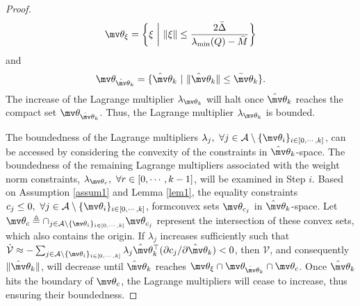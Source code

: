 \documentclass[lettersize,journal]{IEEEtran}
\newcommand*{\wth}{\mv\theta}
\begin{document}
\begin{proof}
\begin{equation}
    \wth_\xi = 
    \bigg\{ \xi \ \bigg\vert\ \Vert\xi\Vert \le  
    {2\bar \Delta\over \lambda _\text{min}(Q)-\bar M} 
    \bigg\}
\end{equation}
and
\begin{equation}\label{eq: hat wth k bnd}
    \wth_{\hat\wth_k} = 
    \{
    \hat\wth_k 
    \ 
    \vert
    \ 
    \Vert
    \hat\wth_k\Vert \le  
    \bar\wth_k
    \}
    .
\end{equation}
The increase of the Lagrange multiplier $\lambda_{\wth_k}$ will halt once $\hat \wth_k$ reaches the compact set $\wth_{\hat\wth_k}$. Thus, the Lagrange multiplier $\lambda_{\wth_k}$ is bounded.





The boundedness of the Lagrange multipliers $\lambda_j,\ \forall j\in\mathcal A\setminus\{\wth_i\}_{i\in[0,\cdots,k]}$, can be accessed by considering the convexity of the constraints in $\hat\wth_k$-space.
The boundedness of the remaining Lagrange multipliers associated with the weight norm constraints, $\lambda_{\wth_r},\ \forall r\in[0,\cdots,k-1]$, will be examined in Step $i$. Based on Assumption \ref{assum1} and Lemma \ref{lem1},  
the equality constraints $c_j \le 0, \ \forall j\in\mathcal A\setminus \{\wth_i\}_{i\in[0,\cdots,k]}$, formconvex sets $\wth_{c_j}$ in $\hat\wth_k$-space.
Let $\wth_c\triangleq \cap_{j\in\mathcal A\setminus \{\wth_i\}_{i\in[0,\cdots ,k]}} \wth_{c_j}$ represent the intersection of these convex sets, which also contains the origin.
If $\lambda_j$ increases sufficiently such that $\dot{\mathcal V} \approx -\sum_{j\in\mathcal A\setminus \{\wth_i\}_{i\in[0,\cdots,k]}}\lambda_j\hat\wth_k^\top(\partial c_j/\partial \hat\wth_k)<0$, then ${\mathcal V}$, and consequently $\Vert\hat\wth_k\Vert$, will decrease until $\hat\wth_k$ reaches $\wth_\xi\cap\wth_{\hat\wth_k}\cap\wth_c$. Once $\hat\wth_k$ hits the boundary of $\wth_c$, the Lagrange multipliers will cease to increase, thus ensuring their boundedness.


\end{proof}
\end{document}
